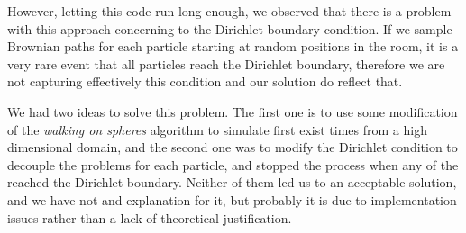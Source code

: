 However, letting this code run long enough, we observed that there is a problem with this approach concerning to the Dirichlet boundary condition. If we sample Brownian paths for each particle starting at random positions in the room, it is a very rare event that all particles reach the Dirichlet boundary, therefore we are not capturing effectively this condition and our solution do reflect that. 

We had two ideas to solve this problem. The first one is to use some modification of the \textit{walking on spheres} algorithm to simulate first exist times from a high dimensional domain, and the second one was to modify the Dirichlet condition to decouple the problems for each particle, and stopped the process when any of the reached the Dirichlet boundary. Neither of them led us to an acceptable solution, and we have not and explanation for it, but probably it is due to implementation issues rather than a lack of theoretical justification.   



